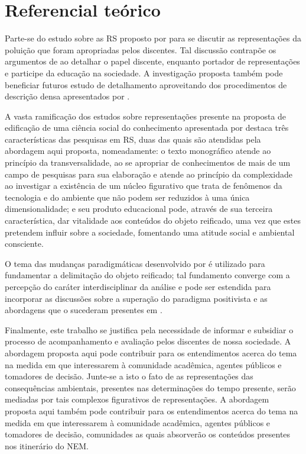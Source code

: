 \documentclass[
  12pt,       %
  openright,      %
  twoside,      %
  a4paper,      %
  english,      %
  french,       %
  spanish,      %
  brazil        %
  ]{abntex2}
\begin{document}
\chapter{Referencial teórico}

Parte-se do estudo sobre as RS proposto por  para se discutir as representações da poluição que foram apropriadas pelos discentes. Tal discussão contrapõe os argumentos de  ao detalhar o papel discente, enquanto portador de representações e participe da educação na sociedade. A investigação proposta também pode beneficiar futuros estudo de detalhamento aproveitando dos procedimentos de descrição densa apresentados por .

A vasta ramificação dos estudos sobre representações presente na proposta de edificação de uma ciência social do conhecimento apresentada por  destaca três características das pesquisas em RS, duas das quais são atendidas pela abordagem aqui proposta, nomeadamente: o texto monográfico atende ao princípio da transversalidade, ao se apropriar de conhecimentos de mais de um campo de pesquisas para sua elaboração e atende ao princípio da complexidade ao investigar a existência de um núcleo figurativo que trata de fenômenos da tecnologia e do ambiente que não podem ser reduzidos à uma única dimensionalidade; e seu produto educacional pode, através de sua terceira característica, dar vitalidade aos conteúdos do objeto reificado, uma vez que estes pretendem influir sobre a sociedade, fomentando uma atitude social e ambiental consciente.

O tema das mudanças paradigmáticas desenvolvido por  é utilizado para fundamentar a delimitação do objeto reificado; tal fundamento converge com a percepção do caráter interdisciplinar da análise e pode ser estendida para incorporar as discussões sobre a superação do paradigma positivista e as abordagens que o sucederam presentes em .

Finalmente, este trabalho se justifica pela necessidade de informar e subsidiar o processo de acompanhamento e avaliação pelos discentes de nossa sociedade. A abordagem proposta aqui pode contribuir para os entendimentos acerca do tema na medida em que interessarem à comunidade acadêmica, agentes públicos e tomadores de decisão. Junte-se a isto o fato de as representações das consequências ambientais, presentes nas determinações do tempo presente, serão mediadas por tais complexos figurativos de representações. A abordagem proposta aqui também pode contribuir para os entendimentos acerca do tema na medida em que interessarem à comunidade acadêmica, agentes públicos e tomadores de decisão, comunidades as quais absorverão os conteúdos presentes nos itinerário do NEM.
\end{document}
